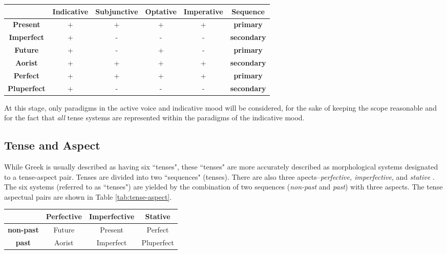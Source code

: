 \documentclass[12pt]{article}
\begin{document}
\begin{table*}
\centering
\begin{tabular}{|c|c|c|c|c|c|}
    \hline
        & \textbf{Indicative} & \textbf{Subjunctive} & \textbf{Optative} & \textbf{Imperative} & \textbf{Sequence}\\    
    \hline
    \textbf{Present}    & + & + & + & + & \textbf{primary}\\ 
    \hline
    \textbf{Imperfect}  & + & - & - & - & \textbf{secondary}\\ 
    \hline
    \textbf{Future}     & + & - & + & - & \textbf{primary}\\ 
    \hline
    \textbf{Aorist}     & + & + & + & + & \textbf{secondary}\\ 
    \hline
    \textbf{Perfect}    & + & + & + & + & \textbf{primary}\\ 
    \hline
    \textbf{Pluperfect} & + & - & - & - & \textbf{secondary}\\ 
    \hline
\end{tabular}
\caption{Tense-Mood Paragigms}
\label{tab:tense-mood}
\end{table*}

At this stage, only paradigms in the active voice and indicative mood will be considered,
for the sake of keeping the scope reasonable and for the fact that \textit{all}
tense systems are represented within the paradigms of the indicative mood.

\subsection{Tense and Aspect}

While Greek is usually described as having six ``tenses", these ``tenses" 
are more accurately described as morphological systems designated to a 
tense-aspect pair. Tenses are divided into two ``sequences" (tenses). There
are also three apects--\textit{perfective, imperfective}, and
\textit{stative} \citep{willi2018}.
The six systems (referred to as ``tenses") are yielded by the combination of 
two sequences (\textit{non-past} and \textit{past}) with three aspects. The 
tense aspectual pairs are shown in Table \ref{tab:tense-aspect}.

\begin{table*}
\centering
\begin{tabular}{|c|c|c|c|}
    \hline
    & \textbf{Perfective} & \textbf{Imperfective} & \textbf{Stative}\\
    \hline
    \textbf{non-past} & Future & Present & Perfect\\
    \hline
    \textbf{past} & Aorist & Imperfect & Pluperfect\\
    \hline
\end{tabular}
\caption{Table of the tense-aspect system}
\label{tab:tense-aspect}
\end{table*}
\end{document}

